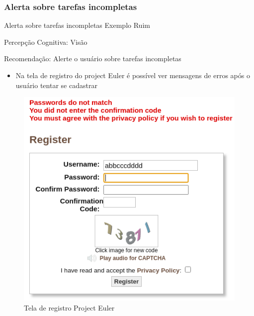 \documentclass{beamer}
\begin{document}
\subsubsection{Alerta sobre tarefas incompletas}
\begin{frame}{Alerta sobre tarefas incompletas Exemplo Ruim}

Percepção Cognitiva: Visão

Recomendação: Alerte o usuário sobre tarefas incompletas

\begin{itemize}
    \item Na tela de registro do project Euler é possível ver mensagens de erros após o usuário tentar se cadastrar
\end{itemize}
\begin{figure}
    \centering
    \includegraphics[scale=0.3]{images/Project-Euler.png}
    \caption{Tela de registro Project Euler}
\end{figure}
\end{frame}
\end{document}

